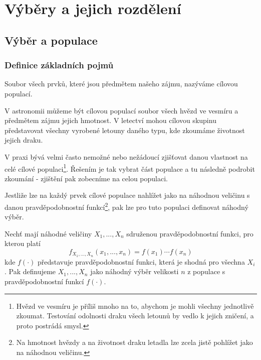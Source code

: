 \chapter{Výběry a jejich rozdělení}

\section{Výběr a populace}

\subsection{Definice základních pojmů}

\begin{definition}
Soubor všech prvků, které jsou předmětem našeho zájmu, nazýváme cílovou populací.
\end{definition}

\begin{example}
V astronomii můžeme být cílovou populací soubor všech hvězd ve vesmíru a předmětem zájmu jejich hmotnost. V letectví mohou cílovou skupinu představovat všechny vyrobené letouny daného typu, kde zkoumáme životnost jejich draku.
\end{example}

V praxi bývá velmi často nemožné nebo nežádoucí zjišťovat danou vlastnost na celé cílové populaci\footnote{Hvězd ve vesmíru je příliš mnoho na to, abychom je mohli všechny jednotlivě zkoumat. Testování odolnosti draku všech letounů by vedlo k jejich zničení, a proto postrádá smysl.}. Řešením je tak vybrat část populace a tu následně podrobit zkoumání - zjištění pak zobecníme na celou populaci.

Jestliže lze na každý prvek cílové populace nahlížet jako na náhodnou veličinu s danou pravděpodobnostní funkcí\footnote{Na hmotnost hvězdy a na životnost draku letadla lze zcela jistě pohlížet jako na náhodnou veličinu.}, pak lze pro tuto populaci definovat náhodný výběr.

\begin{definition}
Nechť mají náhodné veličiny $X_1, ..., X_n$ sdruženou pravděpodobnostní funkci, pro kterou platí
\begin{equation*}
f_{X_1, ..., X_n}(x_1, ..., x_n) = f(x_1) \cdots f(x_n)
\end{equation*}
kde $f(\cdot)$ představuje pravděpodobnostní funkci, která je shodná pro všechna $X_i$. Pak definujeme $X_1, ..., X_n$ jako náhodný výběr velikosti $n$ z populace s pravděpodobnostní funkcí $f(\cdot)$.
\end{definition}

